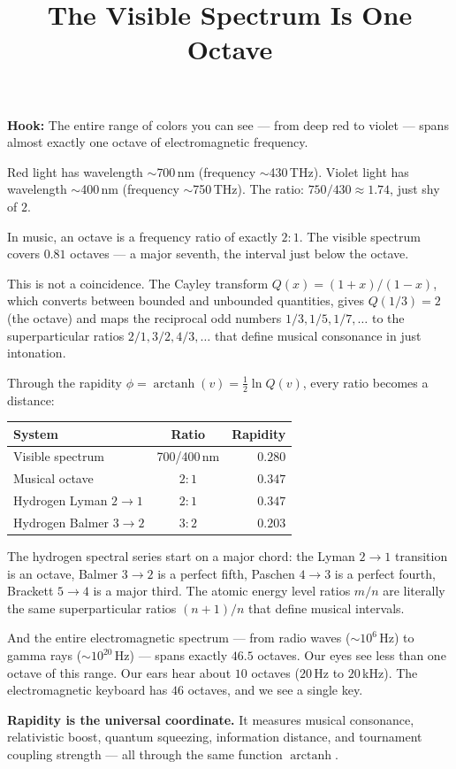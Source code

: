 \documentclass[11pt]{article}
\title{The Visible Spectrum Is One Octave}
\author{}
\date{}
\begin{document}
\maketitle

\noindent\textbf{Hook:} The entire range of colors you can see --- from deep red to violet
--- spans almost exactly one octave of electromagnetic frequency.

\medskip

Red light has wavelength $\sim$700\,nm (frequency $\sim$430\,THz). Violet light
has wavelength $\sim$400\,nm (frequency $\sim$750\,THz). The ratio:
$750/430 \approx 1.74$, just shy of $2$.

In music, an octave is a frequency ratio of exactly $2:1$. The visible spectrum
covers $0.81$ octaves --- a major seventh, the interval just below the octave.

This is not a coincidence. The Cayley transform $Q(x) = (1+x)/(1-x)$, which converts
between bounded and unbounded quantities, gives $Q(1/3) = 2$ (the octave) and maps
the reciprocal odd numbers $1/3, 1/5, 1/7, \ldots$ to the superparticular ratios
$2/1, 3/2, 4/3, \ldots$ that define musical consonance in just intonation.

Through the rapidity $\phi = \operatorname{arctanh}(v) = \tfrac{1}{2}\ln Q(v)$,
every ratio becomes a distance:

\begin{center}
\begin{tabular}{lcr}
System & Ratio & Rapidity \\
\hline
Visible spectrum & 700/400\,nm & $0.280$ \\
Musical octave & $2:1$ & $0.347$ \\
Hydrogen Lyman $2\to1$ & $2:1$ & $0.347$ \\
Hydrogen Balmer $3\to2$ & $3:2$ & $0.203$ \\
\end{tabular}
\end{center}

The hydrogen spectral series start on a major chord: the Lyman $2\to 1$
transition is an octave, Balmer $3\to 2$ is a perfect fifth, Paschen $4\to 3$
is a perfect fourth, Brackett $5\to 4$ is a major third. The atomic
energy level ratios $m/n$ are literally the same superparticular ratios
$(n{+}1)/n$ that define musical intervals.

And the entire electromagnetic spectrum --- from radio waves ($\sim10^6$\,Hz)
to gamma rays ($\sim10^{20}$\,Hz) --- spans exactly $46.5$ octaves.
Our eyes see less than one octave of this range. Our ears hear about $10$ octaves
($20$\,Hz to $20$\,kHz). The electromagnetic keyboard has $46$ octaves, and
we see a single key.

\medskip

\noindent\textbf{Rapidity is the universal coordinate.} It measures musical
consonance, relativistic boost, quantum squeezing, information distance,
and tournament coupling strength --- all through the same function
$\operatorname{arctanh}$.
\end{document}
